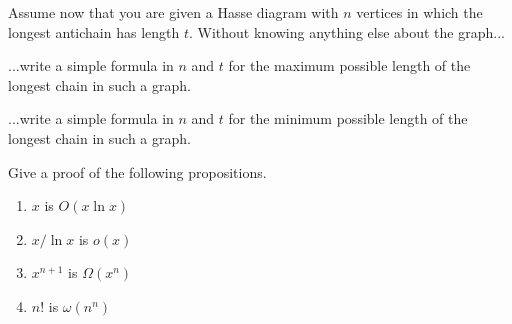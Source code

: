 \documentclass[12pt,oneside]{article}
\begin{document}
\begin{problem}{20}

\eparts

Assume now that you are given a Hasse diagram with $n$ vertices in which the longest antichain has length $t$. Without knowing anything else about the graph...

\bparts
{} ...write a simple formula in $n$ and $t$ for the maximum possible length of the longest chain in such a graph.



 ...write a simple formula in $n$ and $t$ for the minimum possible length of the longest chain in such a graph.

\eparts
\end{problem}


\begin{problem}
Give a proof of the following propositions.

\begin{enumerate}
\item $x$ is $O\left( x\ln{x} \right)$
\item $x/ \ln{x}$  is $o  \left( x \right)$
\item $x^{n+1}$ is $\Omega \left( x^n \right)$
\item $n!$ is $\omega \left( n^n \right)$
\end{enumerate}

\end{problem}
\end{document}
